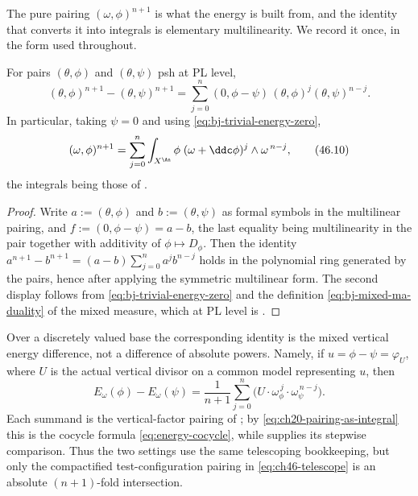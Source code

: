 The pure pairing $(\omega,\phi)^{n+1}$ is what the energy is built from,
and the identity that converts it into integrals is elementary
multilinearity.  We record it once, in the form used throughout.

\begin{lemma}
\label{lem:ch46-telescope}
For pairs $(\theta,\phi)$ and $(\theta,\psi)$ psh at PL level,
\[
 (\theta,\phi)^{n+1}-(\theta,\psi)^{n+1}
 =\sum_{j=0}^{n}(0,\phi-\psi)\,(\theta,\phi)^{j}(\theta,\psi)^{n-j}.
\tag{46.9}\label{eq:ch46-telescope}
\]
In particular, taking $\psi=0$ and using
\eqref{eq:bj-trivial-energy-zero},
\[
 (\omega,\phi)^{n+1}
 =\sum_{j=0}^{n}\int_{X^{\An}}\phi\;
   (\omega+\ddc\phi)^{j}\wedge\omega^{\,n-j},
\tag{46.10}\label{eq:ch46-pure-pairing-as-integrals}
\]
the integrals being those of .
\end{lemma}

\begin{proof}
Write $a:=(\theta,\phi)$ and $b:=(\theta,\psi)$ as formal symbols in
the multilinear pairing, and $f:=(0,\phi-\psi)=a-b$, the last equality
being multilinearity in the pair together with additivity of
$\phi\mapsto D_\phi$.  Then the identity
$a^{n+1}-b^{n+1}=(a-b)\sum_{j=0}^na^jb^{n-j}$ holds in the polynomial
ring generated by the pairs, hence after applying the symmetric
multilinear form.  The second display follows from
\eqref{eq:bj-trivial-energy-zero} and the definition
\eqref{eq:bj-mixed-ma-duality} of the mixed measure, which at PL level is
.
\end{proof}

\begin{remark}
\label{rem:ch46-telescope-part3}
Over a discretely valued base the corresponding identity is the mixed
vertical energy difference, not a difference of absolute powers.  Namely,
if $u=\phi-\psi=\varphi_U$, where $U$ is the actual vertical divisor on
a common model representing $u$, then
\[
 E_\omega(\phi)-E_\omega(\psi)
 =\frac1{n+1}\sum_{j=0}^n
   \bigl(U\cdot\omega_\phi^{\,j}\cdot\omega_\psi^{\,n-j}\bigr).
\]
Each summand is the vertical-factor pairing of
; by
\eqref{eq:ch20-pairing-as-integral} this is the cocycle formula
\eqref{eq:energy-cocycle}, while  supplies its
stepwise comparison.  Thus the two settings use the same telescoping
bookkeeping, but only the compactified test-configuration pairing in
\eqref{eq:ch46-telescope} is an absolute $(n+1)$-fold intersection.
\end{remark}


